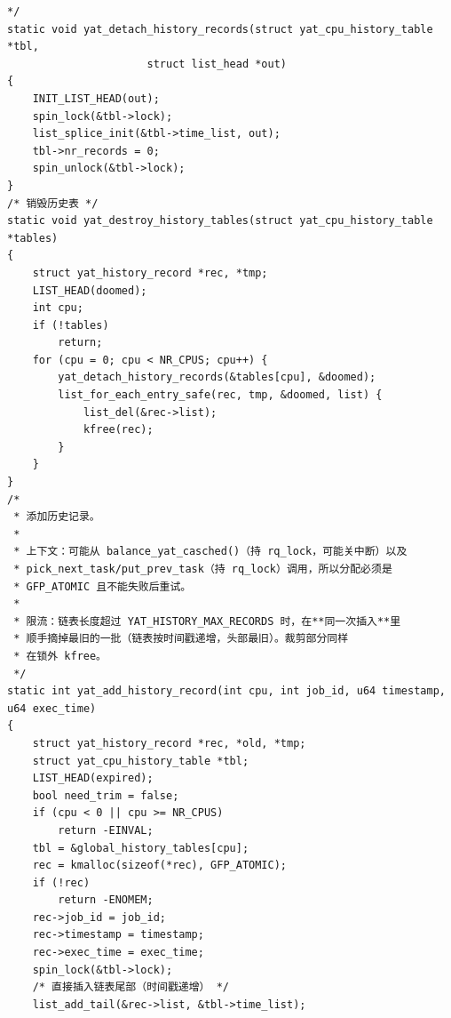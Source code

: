 \documentclass[10pt,a4paper]{article}
\newenvironment{yatpage}{\vspace*{0pt}}{\par}
\begin{document}
\begin{yatpage}
\begin{Verbatim}[fontsize=\fontsize{8.2}{9.8}\selectfont]
 */
static void yat_detach_history_records(struct yat_cpu_history_table *tbl,
				      struct list_head *out)
{
	INIT_LIST_HEAD(out);
	spin_lock(&tbl->lock);
	list_splice_init(&tbl->time_list, out);
	tbl->nr_records = 0;
	spin_unlock(&tbl->lock);
}
/* 销毁历史表 */
static void yat_destroy_history_tables(struct yat_cpu_history_table *tables)
{
    struct yat_history_record *rec, *tmp;
    LIST_HEAD(doomed);
    int cpu;
    if (!tables)
        return;
    for (cpu = 0; cpu < NR_CPUS; cpu++) {
        yat_detach_history_records(&tables[cpu], &doomed);
        list_for_each_entry_safe(rec, tmp, &doomed, list) {
            list_del(&rec->list);
            kfree(rec);
        }
    }
}
/*
 * 添加历史记录。
 *
 * 上下文：可能从 balance_yat_casched()（持 rq_lock，可能关中断）以及
 * pick_next_task/put_prev_task（持 rq_lock）调用，所以分配必须是
 * GFP_ATOMIC 且不能失败后重试。
 *
 * 限流：链表长度超过 YAT_HISTORY_MAX_RECORDS 时，在**同一次插入**里
 * 顺手摘掉最旧的一批（链表按时间戳递增，头部最旧）。裁剪部分同样
 * 在锁外 kfree。
 */
static int yat_add_history_record(int cpu, int job_id, u64 timestamp, u64 exec_time)
{
    struct yat_history_record *rec, *old, *tmp;
    struct yat_cpu_history_table *tbl;
    LIST_HEAD(expired);
    bool need_trim = false;
    if (cpu < 0 || cpu >= NR_CPUS)
        return -EINVAL;
    tbl = &global_history_tables[cpu];
    rec = kmalloc(sizeof(*rec), GFP_ATOMIC);
    if (!rec)
        return -ENOMEM;
    rec->job_id = job_id;
    rec->timestamp = timestamp;
    rec->exec_time = exec_time;
    spin_lock(&tbl->lock);
    /* 直接插入链表尾部（时间戳递增） */
    list_add_tail(&rec->list, &tbl->time_list);
\end{Verbatim}
\end{yatpage}
\newpage
\end{document}

